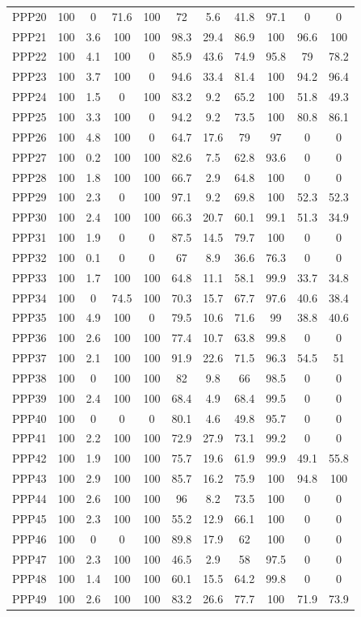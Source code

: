 \documentclass[authoryearcitations]{UoYCSproject}
\begin{document}
\begin{appendices}
\begin{table}
\begin{tabular}{|l|c|c|c|c|c|c|c|c|c|c}
PPP20&100&0&71.6&100&72&5.6&41.8&97.1&0&0\\
PPP21&100&3.6&100&100&98.3&29.4&86.9&100&96.6&100\\
PPP22&100&4.1&100&0&85.9&43.6&74.9&95.8&79&78.2\\
PPP23&100&3.7&100&0&94.6&33.4&81.4&100&94.2&96.4\\
PPP24&100&1.5&0&100&83.2&9.2&65.2&100&51.8&49.3\\
PPP25&100&3.3&100&0&94.2&9.2&73.5&100&80.8&86.1\\
PPP26&100&4.8&100&0&64.7&17.6&79&97&0&0\\
PPP27&100&0.2&100&100&82.6&7.5&62.8&93.6&0&0\\
PPP28&100&1.8&100&100&66.7&2.9&64.8&100&0&0\\
PPP29&100&2.3&0&100&97.1&9.2&69.8&100&52.3&52.3\\
PPP30&100&2.4&100&100&66.3&20.7&60.1&99.1&51.3&34.9\\
PPP31&100&1.9&0&0&87.5&14.5&79.7&100&0&0\\
PPP32&100&0.1&0&0&67&8.9&36.6&76.3&0&0\\
PPP33&100&1.7&100&100&64.8&11.1&58.1&99.9&33.7&34.8\\
PPP34&100&0&74.5&100&70.3&15.7&67.7&97.6&40.6&38.4\\
PPP35&100&4.9&100&0&79.5&10.6&71.6&99&38.8&40.6\\
PPP36&100&2.6&100&100&77.4&10.7&63.8&99.8&0&0\\
PPP37&100&2.1&100&100&91.9&22.6&71.5&96.3&54.5&51\\
PPP38&100&0&100&100&82&9.8&66&98.5&0&0\\
PPP39&100&2.4&100&100&68.4&4.9&68.4&99.5&0&0\\
PPP40&100&0&0&0&80.1&4.6&49.8&95.7&0&0\\
PPP41&100&2.2&100&100&72.9&27.9&73.1&99.2&0&0\\
PPP42&100&1.9&100&100&75.7&19.6&61.9&99.9&49.1&55.8\\
PPP43&100&2.9&100&100&85.7&16.2&75.9&100&94.8&100\\
PPP44&100&2.6&100&100&96&8.2&73.5&100&0&0\\
PPP45&100&2.3&100&100&55.2&12.9&66.1&100&0&0\\
PPP46&100&0&0&100&89.8&17.9&62&100&0&0\\
PPP47&100&2.3&100&100&46.5&2.9&58&97.5&0&0\\
PPP48&100&1.4&100&100&60.1&15.5&64.2&99.8&0&0\\
PPP49&100&2.6&100&100&83.2&26.6&77.7&100&71.9&73.9\\

\end{tabular}
\end{table}
\end{appendices}
\end{document}
